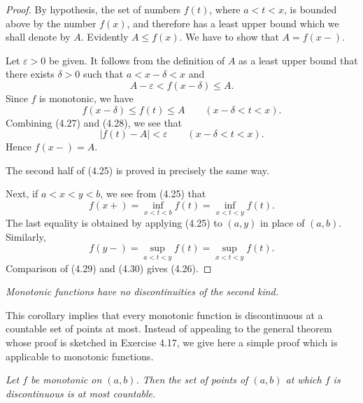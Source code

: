 \begin{proof}
By hypothesis, the set of numbers $f(t)$, where $a < t < x$, is bounded above
by the number $f(x)$, and therefore has a least upper bound which we shall
denote by $A$. Evidently $A \le f(x)$. We have to show that $A = f(x-)$.

Let $\varepsilon > 0$ be given. It follows from the definition of $A$ as a
least upper bound that there exists $\delta > 0$ such that $a < x-\delta < x$
and
\begin{equation}
  A - \varepsilon < f(x-\delta) \le A. \tag{4.27}
\end{equation}
Since $f$ is monotonic, we have
\begin{equation}
  f(x-\delta) \le f(t) \le A \qquad (x-\delta < t < x). \tag{4.28}
\end{equation}
Combining (4.27) and (4.28), we see that
\[ |f(t)-A| < \varepsilon \qquad (x-\delta < t < x). \]
Hence $f(x-) = A$.

The second half of (4.25) is proved in precisely the same way.

Next, if $a < x < y < b$, we see from (4.25) that
\begin{equation}
  f(x+) = \inf_{x<t<b} f(t) = \inf_{x<t<y} f(t). \tag{4.29}
\end{equation}
The last equality is obtained by applying (4.25) to $(a,y)$ in place of
$(a,b)$. Similarly,
\begin{equation}
  f(y-) = \sup_{a<t<y} f(t) = \sup_{x<t<y} f(t). \tag{4.30}
\end{equation}
Comparison of (4.29) and (4.30) gives (4.26).
\end{proof}

\emph{Monotonic functions have no discontinuities of the second kind.}

This corollary implies that every monotonic function is discontinuous at a
countable set of points at most. Instead of appealing to the general theorem
whose proof is sketched in Exercise 4.17, we give here a simple proof which
is applicable to monotonic functions.

\emph{Let $f$ be monotonic on $(a,b)$. Then the set of points of $(a,b)$ at
which $f$ is discontinuous is at most countable.}

